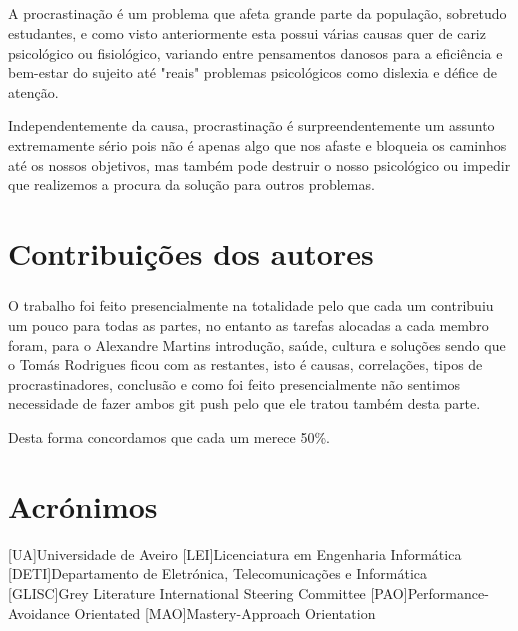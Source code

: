 \documentclass{report}
\begin{document}
\paragraph{}

A procrastinação é um problema que afeta grande parte da população, sobretudo estudantes, e como visto anteriormente esta possui várias causas quer de cariz psicológico ou fisiológico, variando entre pensamentos danosos para a eficiência e bem-estar do sujeito até "reais" problemas psicológicos como dislexia e défice de atenção. 

Independentemente da causa, procrastinação é surpreendentemente um assunto extremamente sério pois não é apenas algo que nos afaste e bloqueia os caminhos até os nossos objetivos, mas também pode destruir o nosso psicológico ou impedir que realizemos a procura da solução para outros problemas.



\chapter*{Contribuições dos autores}
\paragraph{}

 O trabalho foi feito presencialmente na totalidade pelo que cada um contribuiu um pouco para todas as partes, no entanto as tarefas alocadas a cada membro foram, para o Alexandre Martins introdução, saúde, cultura e soluções sendo que o Tomás Rodrigues ficou com as restantes, isto é causas, correlações, tipos de procrastinadores, conclusão e como foi feito presencialmente não sentimos necessidade de fazer ambos git push pelo que ele tratou também desta parte.

 Desta forma concordamos que cada um merece 50\%.

\chapter*{Acrónimos}
\begin{acronym}
[UA]{Universidade de Aveiro}
[LEI]{Licenciatura em Engenharia Informática}
[DETI]{Departamento de Eletrónica, Telecomunicações e Informática}
[GLISC]{Grey Literature International Steering Committee}
[PAO]{Performance-Avoidance Orientated}
[MAO]{Mastery-Approach Orientation}
\end{acronym}
\end{document}
